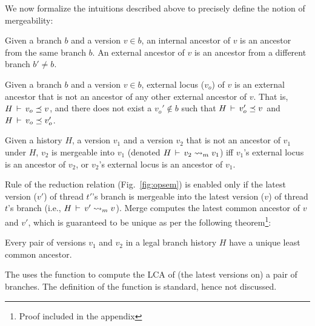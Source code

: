 We now formalize the intuitions described above to precisely define
the notion of mergeability:

\begin{definition} 
Given a branch $b$ and a version $v\in b$, an internal ancestor of $v$
is an ancestor from the same branch $b$. An external ancestor of $v$
is an ancestor from a different branch $b'\neq b$. 
\end{definition}

\begin{definition} 
Given a branch $b$ and a version $v\in b$, external locus ($v_o$) of
$v$ is an external ancestor that is not an ancestor of any other
external ancestor of $v$. That is, $H\,\vdash\,v_o \preceq v$, and
there does not exist a $v_o' \not\in b$ such that $H\,\vdash\,v_o'
\preceq v$ and $H\,\vdash\,v_o \preceq v_o'$. 
\end{definition}

\begin{definition} 
Given a history $H$, a version $v_1$ and a version $v_2$ that is not
an ancestor of $v_1$ under $H$, $v_2$ is mergeable into $v_1$ (denoted
$H\,\vdash\,v_2 \rightsquigarrow_m v_1$) iff $v_1$'s external locus is an
ancestor of $v_2$, or $v_2$'s external locus is an ancestor of $v_1$.
\end{definition}

Rule  of the reduction relation
(Fig.~\ref{fig:opsem}) is enabled only if the latest version ($v'$)
of thread $t'$'s branch is mergeable into the latest version ($v$) of
thread $t$'s branch (i.e., $H\,\vdash\,v' \rightsquigarrow_m v$). Merge computes
the latest common ancestor of $v$ and $v'$, which is 
guaranteed to be unique as per the following theorem\footnote{Proof
included in the appendix}:

\begin{theorem} 
Every pair of versions $v_1$ and $v_2$ in a legal branch history $H$ 
have a unique least common ancestor. 
\end{theorem}

The  uses the function  to compute the
LCA of (the latest versions on) a pair of branches. The definition of
the function is standard, hence not discussed.
